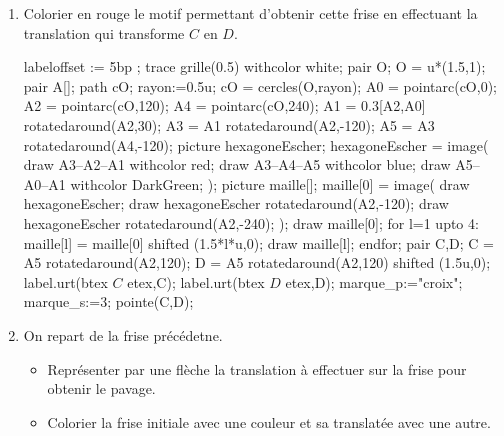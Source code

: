 \begin{exercice*}
    \begin{changemargin}{-5mm}{0mm}
        \begin{enumerate}
            \item Colorier en rouge le motif permettant d'obtenir cette frise en effectuant la translation qui transforme $C$ en $D$.\\
            \hspace*{-7mm}
            \begin{Geometrie}[CoinHD={(8u,3u)}]
                labeloffset := 5bp ;
                trace grille(0.5) withcolor white;
                pair O;
                O = u*(1.5,1);
                pair A[];
                path cO;
                rayon:=0.5u;
                cO = cercles(O,rayon);
                A0 = pointarc(cO,0);
                A2 = pointarc(cO,120);
                A4 = pointarc(cO,240);
                A1 = 0.3[A2,A0] rotatedaround(A2,30);
                A3 = A1 rotatedaround(A2,-120);
                A5 = A3 rotatedaround(A4,-120);        
                picture hexagoneEscher;
                hexagoneEscher = image(
                    draw A3--A2--A1 withcolor red;        
                        draw A3--A4--A5 withcolor blue;        
                        draw A5--A0--A1 withcolor DarkGreen;
                );
                picture maille[];
                maille[0] = image(
                    draw hexagoneEscher;
                    draw hexagoneEscher rotatedaround(A2,-120);
                    draw hexagoneEscher rotatedaround(A2,-240);
                );        
                draw maille[0];
                for l=1 upto 4:
                    maille[l] = maille[0] shifted (1.5*l*u,0);
                    draw maille[l];
                endfor;
                pair C,D;
                C = A5 rotatedaround(A2,120);
                D = A5 rotatedaround(A2,120) shifted (1.5u,0);
                label.urt(btex $C$ etex,C);
                label.urt(btex $D$ etex,D);
                marque_p:="croix";
                marque_s:=3;
                pointe(C,D);
            \end{Geometrie}
            \item On repart de la frise précédetne.
            \begin{itemize}
                \item Représenter par une flèche la translation à effectuer sur la frise pour obtenir le pavage.
                \item Colorier la frise initiale avec une couleur et sa translatée avec une autre.

\end{itemize}
\end{enumerate}
\end{changemargin}
\end{exercice*}
